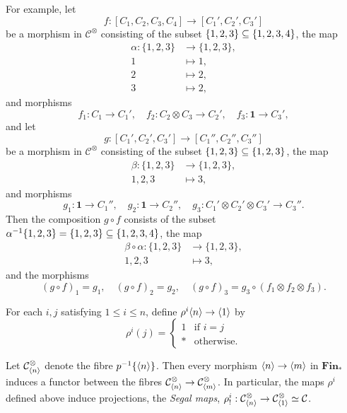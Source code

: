 \documentclass{MetricNotes2023}
\def\subq{\ensuremath\subseteq}
\begin{document}
For example, let 
\[f : [C_1, C_2, C_3, C_4]\to [C_1', C_2', C_3']\]
be a morphism in \(\mathcal{C}^\otimes\) consisting of the subset \(\{1, 2, 3\}\subq \{1, 2, 3, 4\}\), the map
\begin{align*}
\alpha : \{1, 2, 3\}&\to \{1, 2, 3\},\\
1 &\mapsto 1,\\
2 &\mapsto 2,\\
3 &\mapsto 2,
\end{align*}
and morphisms
\[f_1 : C_1 \to C_1', \quad f_2 : C_2 \otimes C_3 \to C_2', \quad f_3 : \textbf{1}\to C_3',\]
and let 
\[g : [C_1', C_2', C_3'] \to [C_1'', C_2'', C_3'']\]
be a morphism in \(\mathcal{C}^\otimes\) consisting of the subset \(\{1, 2, 3\}\subq \{1, 2, 3\}\), the map
\begin{align*}
\beta : \{1, 2, 3\}&\to \{1, 2, 3\},\\
1, 2, 3 &\mapsto 3,
\end{align*}
and morphisms
\[g_1 : \textbf{1} \to C_1'', \quad g_2 : \textbf{1} \to C_2'', \quad g_3 : C_1'\otimes C_2'\otimes C_3' \to C_3''.\]
Then the composition \(g \circ f \) consists of the subset \(\alpha^{-1}\{1, 2, 3\}=\{1, 2, 3\}\subq \{1, 2, 3, 4\}\), the map
\begin{align*}
\beta \circ \alpha : \{1, 2, 3\}&\to \{1, 2, 3\},\\
1, 2, 3 &\mapsto 3,
\end{align*}
and the morphisms
\[(g\circ f)_1 =g_1, \quad (g\circ f)_2 = g_2, \quad (g \circ f)_3 = g_3 \circ (f_1 \otimes f_2 \otimes f_3).\]

For each \(i, j\) satisfying \(1 \leq i \leq n\), define  \(\rho^i \langle n\rangle\to \langle1\rangle\) by
\[\rho^i(j)=\begin{cases}
1 &\text{if } i = j\\
* &\text{otherwise.}
\end{cases}\]

\begin{remark}
Let \(\mathcal{C}^\otimes_{\langle n\rangle}\) denote the fibre \(p^{-1}\{\langle n\rangle\}\). Then every morphism \(\langle n\rangle\to \langle m\rangle\) in \(\textbf{Fin}_*\) induces a functor between the fibres \(\mathcal{C}^\otimes_{\langle n\rangle}\to \mathcal{C}^\otimes_{\langle m\rangle}\). In particular, the maps \(\rho^i\) defined above induce projections, the \textit{Segal maps}, \(\rho_!^i : \mathcal{C}^\otimes_{\langle n\rangle}\to \mathcal{C}^\otimes_{\langle1\rangle}\simeq \mathcal{C}\).
\end{remark}
\end{document}
